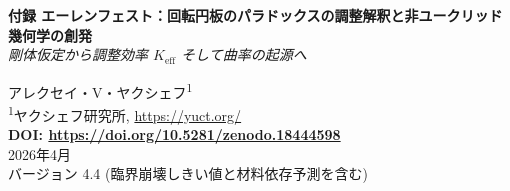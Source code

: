 \documentclass[12pt,a4paper]{article}
\newcommand{\Sodd}{S_{\mathrm{odd}}}
\newcommand{\Seven}{S_{\mathrm{even}}}
\begin{document}
	
	\begin{titlepage}
		\begin{center}
			\vspace*{1cm}
			\Huge\textbf{付録 エーレンフェスト：回転円板のパラドックスの調整解釈と非ユークリッド幾何学の創発} \\
			\vspace{0.5cm}
			\Large\textit{剛体仮定から調整効率 \(K_{\mathrm{eff}}\) そして曲率の起源へ}
			\vspace{1.5cm}
			
			\Large アレクセイ・V・ヤクシェフ\textsuperscript{1} \\
			\vspace{0.3cm}
			\large \textsuperscript{1}ヤクシェフ研究所, \url{https://yuct.org/} \\
			\vspace{1cm}
			\textbf{DOI: \url{https://doi.org/10.5281/zenodo.18444598}} \\
			\vspace{1cm}
			2026年4月 \\ \large バージョン 4.4 (臨界崩壊しきい値と材料依存予測を含む)
			\vspace{2cm}
			
			\begin{minipage}{0.9\textwidth}
				\begin{abstract}
					\noindent
					エーレンフェストのパラドックス（1910）は、相対論的な長さの収縮を考慮しながら、回転する円板上でユークリッド幾何学を維持することが不可能であることを浮き彫りにした。一般相対論では、このパラドックスは回転する観測者に対して非ユークリッド幾何学を導入することで解決される。ここでは、付録 Ferra1.2 で導出された普遍的な調整定数に基づく、ヤクシェフ統一調整理論（YUCT）の枠組みによる解釈を提示する。円周の見かけ上の収縮は、相互距離の事前配布辞書を通じて達成される高い調整効率 \(K_{\mathrm{eff}} > 1\) の現れであることを示す。基本定数 \(\Sodd = 6/5 = 1.2\)、\(\Seven = 4/5 = 0.8\)、その和 \(2\)、比 \(3/2\)、および関係式 \(\Sodd \varphi^2 \approx \pi\)（\(\varphi\) は黄金比）が幾何学的な基幹を提供する。\textbf{調整中心}（回転軸）の概念を導入する。その存在は調整された物質に依存する。角速度が臨界しきい値を超えると、材料の調整効率 \(K_{\mathrm{eff,mat}}\) が臨界値 \(K_{\mathrm{crit}}\) を下回り、調整の壊滅的な喪失に至る。円板は崩壊し、軸は物理的に区別された線として存在しなくなる。臨界角速度の定量的な予測を測定可能な材料パラメータ（ヤング率、密度、引張強度）で導出し、\(K_{\mathrm{eff,mat}}=1\) の極限では破壊力学の標準公式が回復されることを示す。この枠組みを代替理論（一般相対論、古典弾性論）と比較し、新たな検証可能な予測を提供することを示す。すなわち、超伝導円板の臨界速度は通常の円板とは異なるはずであり、これは材料依存の調整効率の直接的な結果である。詳細な実験プロトコルを概説し、高温超伝導体円板の数値見積もりを提供する。
				\end{abstract}
			\end{minipage}
			\vspace{1cm}
			

\end{center}
\end{titlepage}
\end{document}
